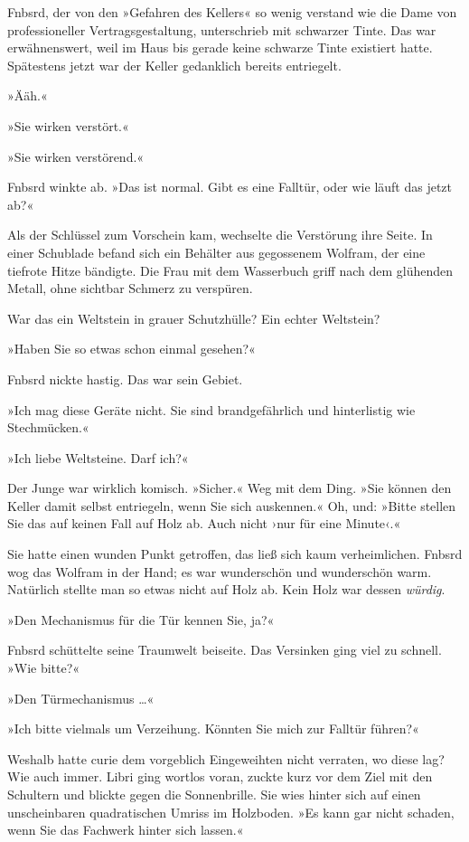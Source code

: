 Fnbsrd, der von den »Gefahren des Kellers« so wenig verstand wie die Dame von professioneller Vertragsgestaltung, unterschrieb mit schwarzer Tinte. Das war erwähnenswert, weil im Haus bis gerade keine schwarze Tinte existiert hatte. Spätestens jetzt war der Keller gedanklich bereits entriegelt.

»Ääh.«

»Sie wirken verstört.«

»Sie wirken verstörend.«

Fnbsrd winkte ab. »Das ist normal. Gibt es eine Falltür, oder wie läuft das jetzt ab?«

Als der Schlüssel zum Vorschein kam, wechselte die Verstörung ihre Seite. In einer Schublade befand sich ein Behälter aus gegossenem Wolfram, der eine tiefrote Hitze bändigte. Die Frau mit dem Wasserbuch griff nach dem glühenden Metall, ohne sichtbar Schmerz zu verspüren.

War das ein Weltstein in grauer Schutzhülle? Ein echter Weltstein?

»Haben Sie so etwas schon einmal gesehen?«

Fnbsrd nickte hastig. Das war sein Gebiet.

»Ich mag diese Geräte nicht. Sie sind brandgefährlich und hinterlistig wie Stechmücken.«

»Ich liebe Weltsteine. Darf ich?«

Der Junge war wirklich komisch. »Sicher.« Weg mit dem Ding. »Sie können den Keller damit selbst entriegeln, wenn Sie sich auskennen.« Oh, und: »Bitte stellen Sie das auf keinen Fall auf Holz ab. Auch nicht ›nur für eine Minute‹.«

Sie hatte einen wunden Punkt getroffen, das ließ sich kaum verheimlichen. Fnbsrd wog das Wolfram in der Hand; es war wunderschön und wunderschön warm. Natürlich stellte man so etwas nicht auf Holz ab. Kein Holz war dessen \emph{würdig}.

»Den Mechanismus für die Tür kennen Sie, ja?«

Fnbsrd schüttelte seine Traumwelt beiseite. Das Versinken ging viel zu schnell. »Wie bitte?«

»Den Türmechanismus …«

»Ich bitte vielmals um Verzeihung. Könnten Sie mich zur Falltür führen?«

Weshalb hatte curie dem vorgeblich Eingeweihten nicht verraten, wo diese lag? Wie auch immer. Libri ging wortlos voran, zuckte kurz vor dem Ziel mit den Schultern und blickte gegen die Sonnenbrille. Sie wies hinter sich auf einen unscheinbaren quadratischen Umriss im Holzboden. »Es kann gar nicht schaden, wenn Sie das Fachwerk hinter sich lassen.«

